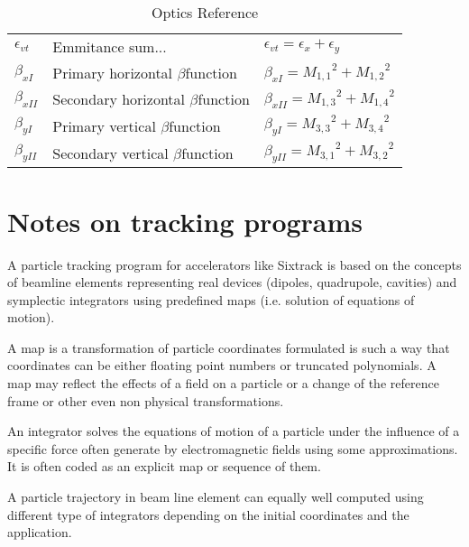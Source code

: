 \documentclass[english]{article}
\begin{document}
\begin{table}
\begin{tabular}{|l|l|l|}
	$\epsilon_{vt}$& Emmitance sum...&$\epsilon_{vt}=\epsilon_x+\epsilon_y$\\
	$\beta_{xI}$&Primary horizontal $\beta $\-function&$\beta_{xI}={M_{1,1}}^2+{M_{1,2}}^2$\\
    $\beta_{xII}$&Secondary horizontal $\beta $\-function&$\beta_{xII}={M_{1,3}}^2+{M_{1,4}}^2$\\
	$\beta_{yI}$&Primary vertical $\beta $\-function&$\beta_{yI}={M_{3,3}}^2+{M_{3,4}}^2$\\
    $\beta_{yII}$&Secondary vertical $\beta $\-function&$\beta_{yII}={M_{3,1}}^2+{M_{3,2}}^2$\\		
		\hline
\end{tabular}
\caption{\label{tab:opticsReference}Optics Reference}
\end{table}



\section{Notes on tracking programs}

A particle tracking program for accelerators like Sixtrack is based on the
concepts of beamline elements representing real devices (dipoles, quadrupole,
cavities) and symplectic integrators using predefined maps (i.e.  solution of
equations of motion).

A map is a transformation of particle coordinates formulated is such a way
that coordinates can be either floating point numbers or truncated
polynomials. A map may reflect the effects of a field on a particle or a
change of the reference frame or other even non physical transformations.

An integrator solves the equations of motion of a particle under the influence
of a specific force often generate by electromagnetic fields using some
approximations. It is often coded as an explicit map or sequence of them.

A particle trajectory in beam line element can equally well computed using
different type of integrators depending on the initial coordinates and the
application.
\end{document}
